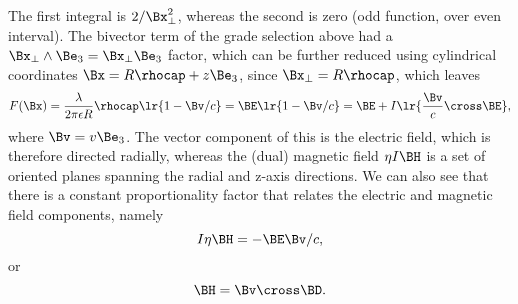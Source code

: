 The first integral is \( 2/\Bx_\perp^2 \), whereas the second is zero (odd function, over even interval).
The bivector term of the grade selection above had a \( \Bx_\perp \wedge \Be_3 = \Bx_\perp \Be_3 \) factor, which can be further reduced using cylindrical coordinates \( \Bx = R \rhocap + z \Be_3 \), since \( \Bx_\perp = R \rhocap \), which leaves
\begin{equation}\label{eqn:statics_infiniteLineCharge:180}
F(\Bx)
=
\frac{\lambda}{2\pi \epsilon R} \rhocap \lr{ 1 - \Bv/c} = \BE \lr{ 1 - \Bv/c }
= \BE + I \lr{ \frac{\Bv}{c} \cross \BE },
\end{equation}
where \( \Bv = v \Be_3 \).
The vector component of this is the electric field, which is therefore directed radially, whereas the (dual) magnetic field \( \eta I \BH \)
is a set of oriented planes spanning the radial and z-axis directions.
We can also see that there is a constant proportionality factor that relates the electric and magnetic field components, namely
\begin{dmath}\label{eqn:statics_infiniteLineCharge:200}
I \eta \BH = -\BE \Bv/c,
\end{dmath}
or
\begin{dmath}\label{eqn:statics_infiniteLineCharge:220}
\BH = \Bv \cross \BD.
\end{dmath}



